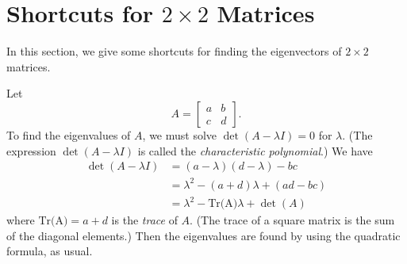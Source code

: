 \documentclass{book}
\begin{document}
\section{Shortcuts for $2\times 2$ Matrices}
In this section, we give
some shortcuts for finding the eigenvectors of $2\times 2$ matrices.

Let
\[
   A = \begin{bmatrix}
              a & b \\ c & d
       \end{bmatrix}.
\]
To find the eigenvalues of $A$, we must solve
$\det(A-\lambda I)=0$ for $\lambda$.
(The expression $\det(A-\lambda I)$ is called
the \emph{characteristic polynomial}.)  We have
\[
\begin{split}
   \det(A-\lambda I) & = (a-\lambda)(d-\lambda)-bc \\
                     & = \lambda^2-(a+d)\lambda + (ad-bc) \\
		     & = \lambda^2 - \textrm{Tr(A)}\lambda + \det(A)
\end{split}
\]
where $\textrm{Tr(A)} = a+d$ is the \emph{trace} of $A$.
(The trace of a square matrix is the sum of the diagonal elements.)
Then the eigenvalues are found by using the quadratic
formula, as usual.
\end{document}
